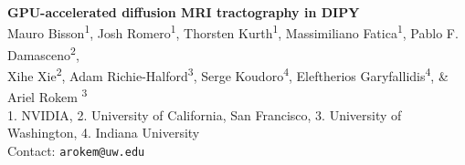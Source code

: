 \documentclass[a0, landscape]{a0poster}
\begin{document}


\begin{minipage}[b]{0.60\linewidth}
\Huge \color{NavyBlue} \textbf{GPU-accelerated diffusion MRI tractography in DIPY} \color{Black} \\ %
{\LARGE Mauro Bisson\textsuperscript{1}, Josh Romero\textsuperscript{1}, Thorsten Kurth\textsuperscript{1}, Massimiliano Fatica\textsuperscript{1}, Pablo F. Damasceno\textsuperscript{2}, \\ Xihe Xie\textsuperscript{2}, Adam Richie-Halford\textsuperscript{3}, Serge Koudoro\textsuperscript{4}, Eleftherios Garyfallidis\textsuperscript{4}, \&  Ariel Rokem \textsuperscript{3}}\\ %
\Large 1. NVIDIA, 2. University of California, San Francisco, 3. University of Washington, 4. Indiana University  \\ %
\Large Contact: \texttt{arokem@uw.edu}
\end{minipage}
%
%
\end{document}
